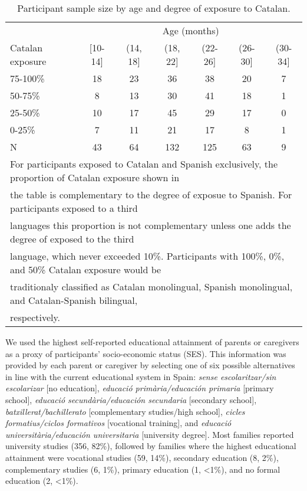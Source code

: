 \documentclass[
]{article}
\begin{document}
\hypertarget{tbl-participants}{}
\begin{table}
\caption{\label{tbl-participants}Participant sample size by age and degree of exposure to Catalan. }\tabularnewline

\centering
\begin{tabular}{lcccccc}
\toprule
\multicolumn{1}{c}{ } & \multicolumn{6}{c}{Age (months)} \\
\cmidrule(l{3pt}r{3pt}){2-7}
Catalan exposure & {}[10-14] & (14, 18] & (18, 22] & (22-26] & (26-30] & (30-34]\\
\midrule
75-100\% & 18 & 23 & 36 & 38 & 20 & 7\\
50-75\% & 8 & 13 & 30 & 41 & 18 & 1\\
25-50\% & 10 & 17 & 45 & 29 & 17 & 0\\
0-25\% & 7 & 11 & 21 & 17 & 8 & 1\\
\midrule
N & 43 & 64 & 132 & 125 & 63 & 9\\
\bottomrule
\multicolumn{7}{l}{\textsuperscript{} For participants exposed to Catalan and Spanish exclusively, the proportion of Catalan exposure shown in}\\
\multicolumn{7}{l}{the table is complementary to the degree of exposue to Spanish. For participants exposed to a third}\\
\multicolumn{7}{l}{languages this proportion is not complementary unless one adds the degree of exposed to the third}\\
\multicolumn{7}{l}{language, which never exceeded 10\%. Participants with 100\%, 0\%, and 50\% Catalan exposure would be}\\
\multicolumn{7}{l}{traditionaly classified as Catalan monolingual, Spanish monolingual, and Catalan-Spanish bilingual,}\\
\multicolumn{7}{l}{respectively.}\\
\end{tabular}
\end{table}

We used the highest self-reported educational attainment of parents or
caregivers as a proxy of participants' socio-economic status (SES). This
information was provided by each parent or caregiver by selecting one of
six possible alternatives in line with the current educational system in
Spain: \emph{sense escolaritzar/sin escolarizar} {[}no education{]},
\emph{educació primària/educación primaria} {[}primary school{]},
\emph{educació secundària/educación secundaria} {[}secondary school{]},
\emph{batxillerat/bachillerato} {[}complementary studies/high school{]},
\emph{cicles formatius/ciclos formativos} {[}vocational training{]}, and
\emph{educació universitària/educación universitaria} {[}university
degree{]}. Most families reported university studies (356, 82\%),
followed by families where the highest educational attainment were
vocational studies (59, 14\%), secondary education (8, 2\%),
complementary studies (6, 1\%), primary education (1, \textless1\%), and
no formal education (2, \textless1\%).
\end{document}
